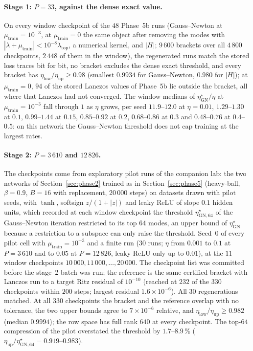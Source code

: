 \documentclass[11pt]{article}
\theoremstyle{remark}
\begin{document}
\paragraph{Stage 1: $P=33$, against the dense exact value.} On every window checkpoint of the $48$ Phase~5b runs (Gauss--Newton at $\mu_{\mathrm{train}}=10^{-3}$, at $\mu_{\mathrm{train}}=0$ the same object after removing the modes with $|\lambda+\mu_{\mathrm{train}}|<10^{-8}\lambda_{\mathrm{top}}$, a numerical kernel, and $|H|$; $9\,600$ brackets over all $4\,800$ checkpoints, $2\,448$ of them in the window), the regenerated runs match the stored loss traces bit for bit, no bracket excludes the dense exact threshold, and every bracket has $\eta_{\mathrm{low}}/\eta_{\mathrm{up}}\ge0.98$ (smallest $0.9934$ for Gauss--Newton, $0.980$ for $|H|$); at $\mu_{\mathrm{train}}=0$, $94$ of the stored Lanczos values of Phase~5b lie outside the bracket, all where that Lanczos had not converged. The window medians of $\eta^\star_{\mathrm{GN}}/\eta$ at $\mu_{\mathrm{train}}=10^{-3}$ fall through $1$ as $\eta$ grows, per seed $11.9$--$12.0$ at $\eta=0.01$, $1.29$--$1.30$ at $0.1$, $0.99$--$1.44$ at $0.15$, $0.85$--$0.92$ at $0.2$, $0.68$--$0.86$ at $0.3$ and $0.48$--$0.76$ at $0.4$--$0.5$: on this network the Gauss--Newton threshold does not cap training at the largest rates.

\paragraph{Stage 2: $P=3\,610$ and $12\,826$.} The checkpoints come from exploratory pilot runs of the companion lab: the two networks of Section~\ref{sec:phase2} trained as in Section~\ref{sec:phase5} (heavy-ball, $\beta=0.9$, $B=16$ with replacement, $20\,000$ steps) on datasets drawn with pilot seeds, with $\tanh$, softsign $z/(1+|z|)$ and leaky ReLU of slope $0.1$ hidden units, which recorded at each window checkpoint the threshold $\eta^\star_{\mathrm{GN},64}$ of the Gauss--Newton iteration restricted to its top $64$ modes, an upper bound of $\eta^\star_{\mathrm{GN}}$ because a restriction to a subspace can only raise the threshold. Seed~$0$ of every pilot cell with $\mu_{\mathrm{train}}=10^{-3}$ and a finite run ($30$ runs; $\eta$ from $0.001$ to $0.1$ at $P=3\,610$ and to $0.05$ at $P=12\,826$, leaky ReLU only up to $0.01$), at the $11$ window checkpoints $10\,000,11\,000,\dots,20\,000$. The checkpoint list was committed before the stage~2 batch was run; the reference is the same certified bracket with Lanczos run to a target Ritz residual of $10^{-10}$ (reached at $232$ of the $330$ checkpoints within $200$ steps; largest residual $1.6\times10^{-6}$). All $30$ regenerations matched. At all $330$ checkpoints the bracket and the reference overlap with no tolerance, the two upper bounds agree to $7\times10^{-6}$ relative, and $\eta_{\mathrm{low}}/\eta_{\mathrm{up}}\ge0.982$ (median $0.9994$); the row space has full rank $640$ at every checkpoint. The top-$64$ compression of the pilot overstated the threshold by $1.7$--$8.9\,\%$ ($\eta_{\mathrm{up}}/\eta^\star_{\mathrm{GN},64}=0.919$--$0.983$).
\end{document}
